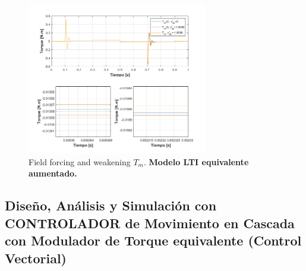 \documentclass[10pt]{article}
\begin{document}
\begin{itemize}
	\begin{figure}[h!]
	\centering
	\includegraphics[width=0.7\textwidth]{Tdistintode0LTI.png}
	\caption{\label{fig:Tdistintode0LTI} Field forcing and weakening $T_{m}$.\textbf{ Modelo LTI equivalente aumentado.}}
	\end{figure}
\end{itemize}
\newpage
\subsection{Diseño, Análisis y Simulación con CONTROLADOR de Movimiento en Cascada con Modulador de Torque equivalente (Control Vectorial)}
\end{document}
